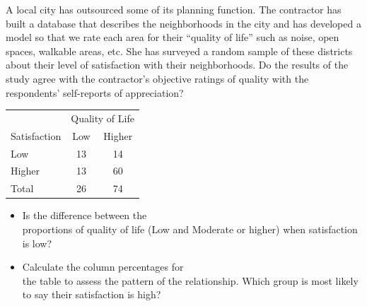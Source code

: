\documentclass[11pt, chapterprefix=true]{scrbook}\usepackage[]{graphicx}\usepackage[]{color}
\begin{document}
 \newpage

\twocolumn

\begin{exercises}
  \begin{exercise}  %

 A local city has outsourced some of its planning function.  The contractor has built a database that describes the neighborhoods in the city and has developed a model so that we rate each area for their ``quality of life'' such as noise, open spaces, walkable areas, etc.  She has surveyed a random sample of these districts about their level of satisfaction with their neighborhoods.   Do the results of the study agree with the contractor's objective ratings of quality with the respondents' self-reports of appreciation?

    \begin{table}[htbp]
   \centering
   \begin{tabular}{@{} lcc @{}} \hline %

    &  \multicolumn{2}{c}{Quality of Life} \\
    Satisfaction       & Low  & Higher  \\ \hline
    Low                & 13 & 14 \\
    Higher             & 13 & 60 \\ \hline
    Total              & 26 & 74 \\ \hline
    \end{tabular}
    \label{tab:c10_9}
  \end{table}

	  \begin{itemize}
	  \item Is the difference between the \\ proportions of quality of life (Low and Moderate or higher) when satisfaction is low?
	  \item Calculate the column percentages for \\ the table to assess the pattern of the relationship.  Which group is most likely to say their satisfaction is high?
	  \end{itemize}
	  \vspace{5mm}


\end{exercise}
\end{exercises}
\end{document}
